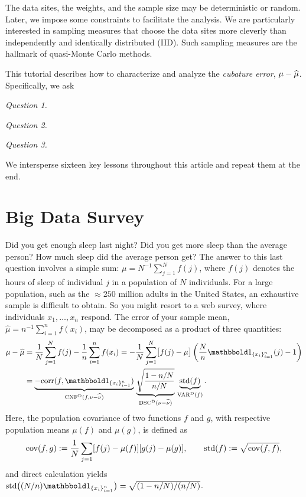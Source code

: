 \documentclass[graybox,footinfo]{svmult}
\DeclareMathOperator{\Cov}{cov}
\DeclareMathOperator{\algn}{CNF}
\DeclareMathOperator{\disc}{DSC}
\DeclareMathOperator{\Var}{VAR}
\begin{document}
The data sites, the 
weights, and the sample size may be deterministic or random.  Later, we impose some 
constraints to facilitate 
the analysis.  We are 
particularly interested in sampling measures that choose the data sites more cleverly 
than independently and identically distributed (IID).  Such sampling measures are the 
hallmark of quasi-Monte Carlo methods.

This tutorial describes how to characterize and analyze the \emph{cubature error}, $\mu 
- \widehat{\mu}$.  
Specifically, we ask
\begin{list}{}{\setlength\leftmargin{7ex}\setlength{}}
\item[\emph{Question 1.}] \emph{\FJHQOne}
\item[\emph{Question 2.}] \emph{\FJHQTwo}
\item[\emph{Question 3.}] \emph{\FJHQThree}
\end{list}
\noindent We intersperse sixteen key lessons throughout this 
article and repeat them at the end.

\section{Big Data Survey} \label{FJH:sec:sleep} 
Did you get enough sleep last night?  Did you get more sleep than the average person?  
How much sleep did the average person get? The answer to this last question involves a 
simple sum:  $\mu = N^{-1} \sum_{j=1}^N f(j)$, where $f(j)$ 
denotes the hours of sleep of 
individual 
$j$ in a population of $N$ individuals.  For a large population, such as the $\approx 250$ 
million adults in the United States, an exhaustive sample is difficult to obtain. So you 
might resort to a 
web survey, where individuals $x_1, \ldots, x_n$ respond.  The error of 
your sample mean, $\widehat{\mu} = n^{-1} \sum_{i=1}^n f(x_i)$, may be decomposed as 
a 
product of three quantities:
\begin{align}
\nonumber
\mu - \widehat{\mu} 
&= \frac{1}N \sum_{j=1}^N f(j) -  \frac 1n \sum_{i=1}^n f(x_i)  = - \frac{1}N \sum_{j=1}^N \bigl[ f(j) 
- \mu \bigr]\left ( \frac Nn \bbone_{\{x_i\}_{i=1}^n}(j) 
- 1 \right) \\
& = \underbrace{-\corr(f, \bbone_{\{x_i\}_{i=1}^n})}_{\algn^\Dt(f,\nu - \hnu)} \,
\underbrace{\sqrt{\frac{1 - n/N}{n/N}}}_{\disc^\Dt(\nu - \hnu)} \, 
\underbrace{\std(f)}_{\Var^\Dt(f)}.
\label{FJH:eq:surveydettrio}
\end{align}
Here, the population covariance of two functions $f$ and $g$, with respective 
population means $\mu(f)$ and $\mu(g)$, is defined as 
\begin{equation*}
\Cov(f,g) : = \frac 1N \sum_{j=1} [f(j) - \mu(f)] [g(j) - \mu(g)], \qquad 
\std(f) : = \sqrt{\Cov(f,f)},
\end{equation*}
and direct calculation yields $\std\bigl((N/n)\bbone_{\{x_i\}_{i=1}^n}\bigr) = 
\sqrt{(1 - n/N)/(n/N)}$.
\end{document}
